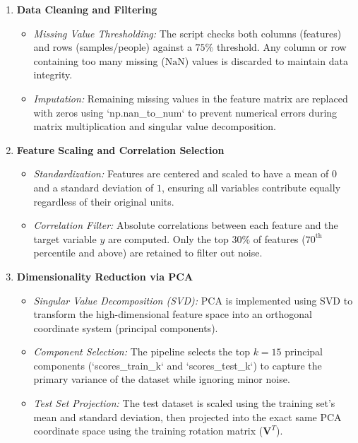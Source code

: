 \documentclass[11pt, a4paper]{article}
\begin{document}
\begin{enumerate}[leftmargin=*]
    \item \textbf{Data Cleaning and Filtering}
    \begin{itemize}
        \item \emph{Missing Value Thresholding:} The script checks both columns (features) and rows (samples/people) against a $75\%$ threshold. Any column or row containing too many missing ($\text{NaN}$) values is discarded to maintain data integrity.
        \item \emph{Imputation:} Remaining missing values in the feature matrix are replaced with zeros using `np.nan\_to\_num` to prevent numerical errors during matrix multiplication and singular value decomposition.
    \end{itemize}
    
    \item \textbf{Feature Scaling and Correlation Selection}
    \begin{itemize}
        \item \emph{Standardization:} Features are centered and scaled to have a mean of $0$ and a standard deviation of $1$, ensuring all variables contribute equally regardless of their original units.
        \item \emph{Correlation Filter:} Absolute correlations between each feature and the target variable $y$ are computed. Only the top $30\%$ of features ($70^{\text{th}}$ percentile and above) are retained to filter out noise.
    \end{itemize}
    
    \item \textbf{Dimensionality Reduction via PCA}
    \begin{itemize}
        \item \emph{Singular Value Decomposition (SVD):} PCA is implemented using SVD to transform the high-dimensional feature space into an orthogonal coordinate system (principal components).
        \item \emph{Component Selection:} The pipeline selects the top $k = 15$ principal components (`scores\_train\_k` and `scores\_test\_k`) to capture the primary variance of the dataset while ignoring minor noise.
        \item \emph{Test Set Projection:} The test dataset is scaled using the training set's mean and standard deviation, then projected into the exact same PCA coordinate space using the training rotation matrix ($\mathbf{V}^T$).
    \end{itemize}
    

\end{enumerate}
\end{document}
